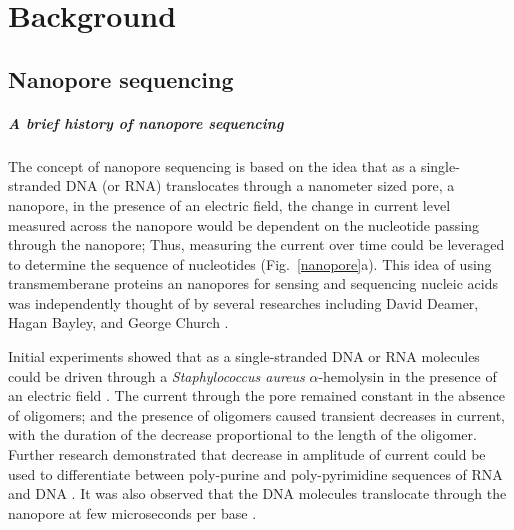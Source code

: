 \chapter{Background}
\label{ch2}

\section{Nanopore sequencing}

\paragraph{A brief history of nanopore sequencing}
The concept of nanopore sequencing is based on the idea that as a
single-stranded DNA (or RNA) translocates through a nanometer sized
pore, a nanopore, in the presence of an electric field, the change in
current level measured across the nanopore would be dependent on the
nucleotide passing through the nanopore; Thus, measuring the current
over time could be leveraged to determine the sequence of nucleotides
(Fig.~\ref{nanopore}a).
%
This idea of using transmemberane proteins an nanopores for sensing and
sequencing nucleic acids was independently thought of by several
researches including David Deamer, Hagan Bayley, and George Church
\citep{deamer2016three,bayley2015nanopore,branton2010potential}.

Initial experiments showed that as a single-stranded DNA or RNA
molecules could be driven through a \emph{Staphylococcus aureus}
$\alpha$-hemolysin in the presence of an electric field
\citep{kasianowicz1996characterization}. The current through the pore
remained constant in the absence of oligomers; and the presence of oligomers
caused transient decreases in current, with the duration of the decrease
proportional to the length of the oligomer.
Further research demonstrated that decrease in amplitude of current
could be used to differentiate between poly-purine and poly-pyrimidine
sequences of RNA \citep{akeson1999microsecond} and DNA
\citep{meller2000rapid}. It was also observed that the DNA molecules
translocate through the nanopore at few microseconds per base
\citep{meller2000rapid}.

